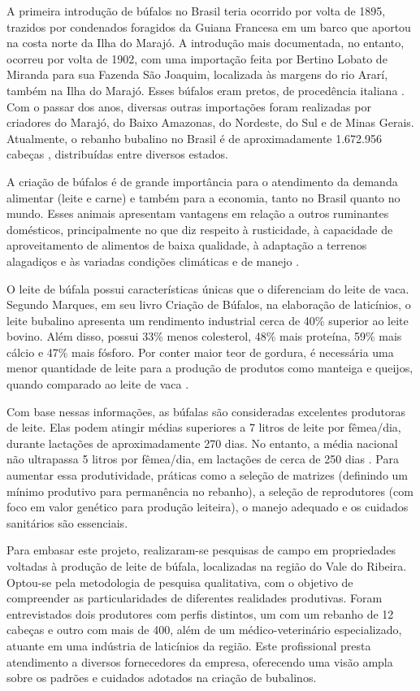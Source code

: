 A primeira introdução de búfalos no Brasil teria ocorrido por volta de 1895, trazidos por condenados foragidos da Guiana Francesa em um barco que aportou na costa norte da Ilha do Marajó. A introdução mais documentada, no entanto, ocorreu por volta de 1902, com uma importação feita por Bertino Lobato de Miranda para sua Fazenda São Joaquim, localizada às margens do rio Ararí, também na Ilha do Marajó. Esses búfalos eram pretos, de procedência italiana \cite{ABCB2016}. Com o passar dos anos, diversas outras importações foram realizadas por criadores do Marajó, do Baixo Amazonas, do Nordeste, do Sul e de Minas Gerais. Atualmente, o rebanho bubalino no Brasil é de aproximadamente 1.672.956 cabeças \cite{IBGE2023}, distribuídas entre diversos estados.

A criação de búfalos é de grande importância para o atendimento da demanda alimentar (leite e carne) e também para a economia, tanto no Brasil quanto no mundo. Esses animais apresentam vantagens em relação a outros ruminantes domésticos, principalmente no que diz respeito à rusticidade, à capacidade de aproveitamento de alimentos de baixa qualidade, à adaptação a terrenos alagadiços e às variadas condições climáticas e de manejo \cite{EMBRAPA2019}.

O leite de búfala possui características únicas que o diferenciam do leite de vaca. Segundo Marques, em seu livro Criação de Búfalos, na elaboração de laticínios, o leite bubalino apresenta um rendimento industrial cerca de 40\% superior ao leite bovino. Além disso, possui 33\% menos colesterol, 48\% mais proteína, 59\% mais cálcio e 47\% mais fósforo. Por conter maior teor de gordura, é necessária uma menor quantidade de leite para a produção de produtos como manteiga e queijos, quando comparado ao leite de vaca \cite{Embrapa1998}.

Com base nessas informações, as búfalas são consideradas excelentes produtoras de leite. Elas podem atingir médias superiores a 7 litros de leite por fêmea/dia, durante lactações de aproximadamente 270 dias. No entanto, a média nacional não ultrapassa 5 litros por fêmea/dia, em lactações de cerca de 250 dias \cite{Embrapa1998}. Para aumentar essa produtividade, práticas como a seleção de matrizes (definindo um mínimo produtivo para permanência no rebanho), a seleção de reprodutores (com foco em valor genético para produção leiteira), o manejo adequado e os cuidados sanitários são essenciais.

Para embasar este projeto, realizaram-se pesquisas de campo em propriedades voltadas à produção de leite de búfala, localizadas na região do Vale do Ribeira. Optou-se pela metodologia de pesquisa qualitativa, com o objetivo de compreender as particularidades de diferentes realidades produtivas. Foram entrevistados dois produtores com perfis distintos, um com um rebanho de 12 cabeças e outro com mais de 400, além de um médico-veterinário especializado, atuante em uma indústria de laticínios da região. Este profissional presta atendimento a diversos fornecedores da empresa, oferecendo uma visão ampla sobre os padrões e cuidados adotados na criação de bubalinos.

